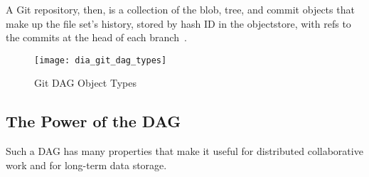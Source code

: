 A Git \gls{repository}, then, is a collection of the \gls{blob}, \gls{tree}, and
\gls{commit} objects that make up the file set's history, stored by hash ID in
the \gls{objectstore}, with \glspl{ref} to the \glspl{commit} at the \gls{head}
of each \gls{branch}~\cite{git_initial_readme}.

\begin{figure}[]
    \centering
        \texttt{[image: dia\_git\_dag\_types]}
    \caption{Git DAG Object Types}
    \label{dia_git_dag_types}
\end{figure}


%

\subsection{The Power of the DAG}

Such a \gls{DAG} has many properties that make it useful for distributed
collaborative work and for long-term data storage.

